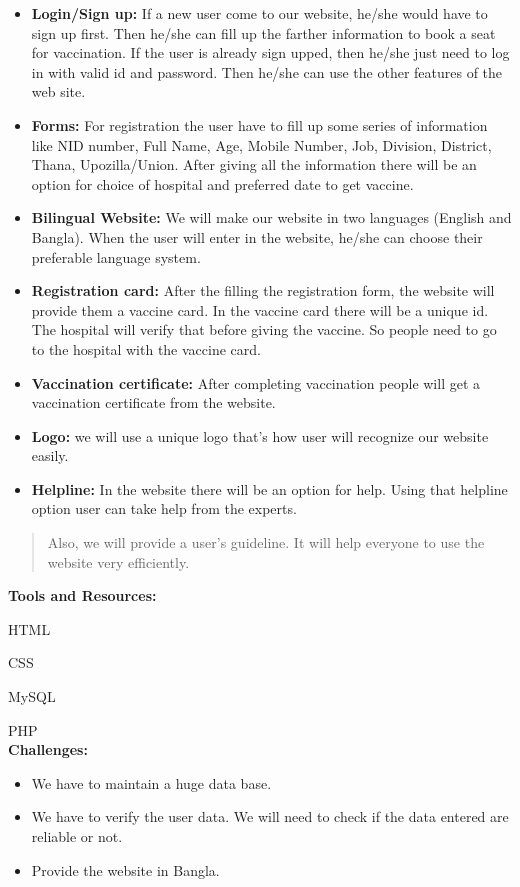\documentclass[
]{article}
\begin{document}
\begin{itemize}
\item
  \textbf{Login/Sign up:} If a new user come to our website, he/she
  would have to sign up first. Then he/she can fill up the farther
  information to book a seat for vaccination. If the user is already
  sign upped, then he/she just need to log in with valid id and
  password. Then he/she can use the other features of the web site.
\item
  \textbf{Forms:} For registration the user have to fill up some series
  of information like NID number, Full Name, Age, Mobile Number, Job,
  Division, District, Thana, Upozilla/Union. After giving all the
  information there will be an option for choice of hospital and
  preferred date to get vaccine.
\item
  \textbf{Bilingual Website:} We will make our website in two languages
  (English and Bangla). When the user will enter in the website, he/she
  can choose their preferable language system.
\item
  \textbf{Registration card:} After the filling the registration form,
  the website will provide them a vaccine card. In the vaccine card
  there will be a unique id. The hospital will verify that before giving
  the vaccine. So people need to go to the hospital with the vaccine
  card.
\item
  \textbf{Vaccination certificate:} After completing vaccination people
  will get a vaccination certificate from the website.
\item
  \textbf{Logo:} we will use a unique logo that's how user will
  recognize our website easily.
\item
  \textbf{Helpline:} In the website there will be an option for help.
  Using that helpline option user can take help from the experts.
\end{itemize}

\begin{quote}
Also, we will provide a user's guideline. It will help everyone to use
the website very efficiently.\\[2mm]
\end{quote}

\textbf{Tools and Resources:}

HTML

CSS

MySQL

PHP\\[2mm]

\textbf{Challenges:}

\begin{itemize}
\item
  We have to maintain a huge data base.
\item
  We have to verify the user data. We will need to check if the data
  entered are reliable or not.
\item
  Provide the website in Bangla.
\end{itemize}
\end{document}

